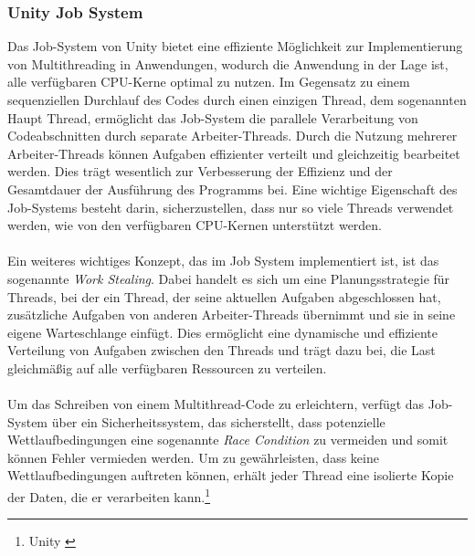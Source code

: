 \subsubsection{\label{sec:JobSystem}Unity Job System}
Das Job-System von Unity bietet eine effiziente Möglichkeit zur Implementierung von Multithreading in Anwendungen, wodurch die Anwendung in
der Lage ist, alle verfügbaren CPU-Kerne optimal zu nutzen. Im Gegensatz zu einem sequenziellen Durchlauf des Codes durch einen einzigen Thread, dem sogenannten Haupt Thread, ermöglicht das Job-System die parallele Verarbeitung von Codeabschnitten durch separate Arbeiter-Threads. Durch die Nutzung mehrerer Arbeiter-Threads können Aufgaben effizienter verteilt und gleichzeitig bearbeitet werden. Dies trägt wesentlich zur Verbesserung der Effizienz und der Gesamtdauer der Ausführung des Programms bei. Eine wichtige Eigenschaft des Job-Systems besteht darin, sicherzustellen, dass nur so viele Threads verwendet werden, wie von den verfügbaren CPU-Kernen unterstützt werden.\\
\\
Ein weiteres wichtiges Konzept, das im Job System implementiert ist, ist das sogenannte \textit{Work Stealing}. Dabei handelt es sich um eine Planungsstrategie für Threads, bei der ein Thread, der seine aktuellen Aufgaben abgeschlossen hat, zusätzliche Aufgaben von anderen Arbeiter-Threads übernimmt und sie in seine eigene Warteschlange einfügt. Dies ermöglicht eine dynamische und effiziente Verteilung von Aufgaben zwischen den Threads und trägt dazu bei, die Last gleichmäßig auf alle verfügbaren Ressourcen zu verteilen. \\
\\
Um das Schreiben von einem Multithread-Code zu erleichtern, verfügt das Job-System über ein Sicherheitssystem, das sicherstellt, dass potenzielle Wettlaufbedingungen eine sogenannte \textit{Race Condition} zu vermeiden und somit können Fehler vermieden werden. Um zu gewährleisten, dass keine Wettlaufbedingungen auftreten können, erhält jeder Thread eine isolierte Kopie der Daten, die er verarbeiten kann.\protect\footnote{Unity \cite{Job System}}


